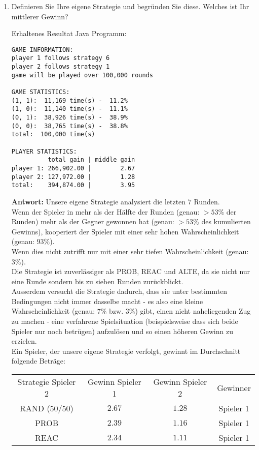 \documentclass[12pt,a4paper]{article}
\begin{document}
\begin{enumerate}
\item Definieren Sie Ihre eigene Strategie und begründen Sie diese.
Welches ist Ihr mittlerer Gewinn?
\begin{center}Erhaltenes Resultat Java Programm:\end{center}
\begin{verbatim}
GAME INFORMATION:
player 1 follows strategy 6
player 2 follows strategy 1
game will be played over 100,000 rounds

GAME STATISTICS:
(1, 1):  11,169 time(s) -  11.2%
(1, 0):  11,140 time(s) -  11.1%
(0, 1):  38,926 time(s) -  38.9%
(0, 0):  38,765 time(s) -  38.8%
total:  100,000 time(s)

PLAYER STATISTICS:
          total gain | middle gain
player 1: 266,902.00 |        2.67
player 2: 127,972.00 |        1.28
total:    394,874.00 |        3.95
\end{verbatim}
\textbf{Antwort:} Unsere eigene Strategie analysiert die letzten $7$ Runden.\\
Wenn der Spieler in mehr als der Hälfte der Runden (genau: $>53\%$ der Runden) mehr als der Gegner gewonnen hat (genau: $>53\%$ des kumulierten Gewinns),
kooperiert der Spieler mit einer sehr hohen Wahrscheinlichkeit (genau: $93\%$).\\
Wenn dies nicht zutrifft nur mit einer sehr tiefen Wahrscheinlichkeit (genau: $3\%$).\\
Die Strategie ist zuverlässiger als PROB, REAC und ALTE, da sie nicht nur eine Runde sondern bis zu sieben Runden zurückblickt.\\
Ausserdem versucht die Strategie dadurch, dass sie unter bestimmten Bedingungen nicht immer dasselbe macht - es also eine kleine Wahrscheinlichkeit (genau: $7\%$ bzw. $3\%$) gibt,
einen nicht naheliegenden Zug zu machen - eine verfahrene Spielsituation (beispielsweise dass sich beide Spieler nur noch betrügen) aufzulösen und so einen höheren Gewinn zu erzielen.\\
Ein Spieler, der unsere eigene Strategie verfolgt, gewinnt im Durchschnitt folgende Beträge:
\begin{center}
\begin{tabular}{c c c c}
 Strategie Spieler 2 & Gewinn Spieler 1 & Gewinn Spieler 2 & Gewinner \\
     RAND (50/50)    &      $2.67$      &      $1.28$      & Spieler 1\\
        PROB         &      $2.39$      &      $1.16$      & Spieler 1\\
        REAC         &      $2.34$      &      $1.11$      & Spieler 1\\

\end{tabular}
\end{center}
\end{enumerate}
\end{document}

